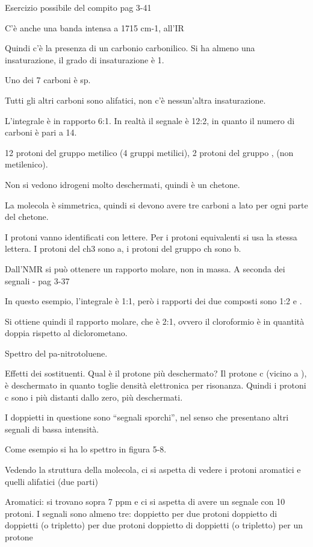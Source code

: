 Esercizio possibile del compito pag 3-41

C'è anche una banda intensa a 1715 cm-1, all'IR

Quindi c'è la presenza di un carbonio carbonilico. Si ha almeno una
insaturazione, il grado di insaturazione è 1.

Uno dei 7 carboni è sp.

Tutti gli altri carboni sono alifatici, non c'è nessun'altra
insaturazione.

L'integrale è in rapporto 6:1. In realtà il segnale è 12:2, in quanto il
numero di carboni è pari a 14.

12 protoni del gruppo metilico (4 gruppi metilici), 2 protoni del gruppo
, (non metilenico).

Non si vedono idrogeni molto deschermati, quindi è un chetone.

La molecola è simmetrica, quindi si devono avere tre carboni a lato per
ogni parte del chetone.

I protoni vanno identificati con lettere. Per i protoni equivalenti si
usa la stessa lettera. I protoni del ch3 sono a, i protoni del gruppo ch
sono b.

Dall'NMR si può ottenere un rapporto molare, non in massa. A seconda dei
segnali - pag 3-37

In questo esempio, l'integrale è 1:1, però i rapporti dei due composti
sono 1:2  e .

Si ottiene quindi il rapporto molare, che è 2:1, ovvero il cloroformio è
in quantità doppia rispetto al diclorometano.








Spettro del pa-nitrotoluene.

Effetti dei sostituenti. Qual è il protone più deschermato? Il protone c
(vicino a ), è deschermato in quanto  toglie densità elettronica
per risonanza. Quindi i protoni c sono i più distanti dallo zero, più
deschermati.

I doppietti in questione sono ``segnali sporchi'', nel senso che
presentano altri segnali di bassa intensità.


Come esempio si ha lo spettro in figura 5-8.

Vedendo la struttura della molecola, ci si aspetta di vedere i protoni
aromatici e quelli alifatici (due parti)

Aromatici: si trovano sopra 7 ppm e ci si aspetta di avere un segnale
con 10 protoni. I segnali sono almeno tre: doppietto per due protoni
doppietto di doppietti (o tripletto) per due protoni doppietto di
doppietti (o tripletto) per un protone

